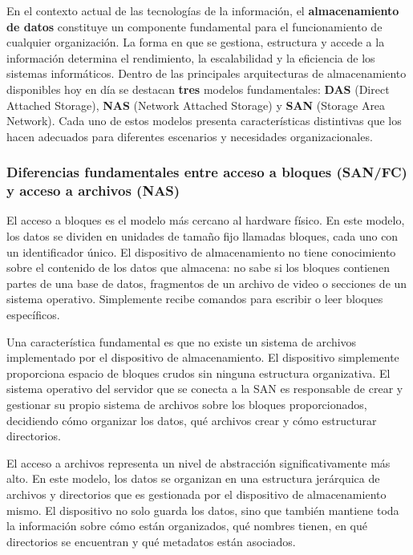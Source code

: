 En el contexto actual de las tecnologías de la información, el \textbf{almacenamiento de datos} constituye un componente fundamental para el funcionamiento de cualquier organización. La forma en que se gestiona, estructura y accede a la información determina el rendimiento, la escalabilidad y la eficiencia de los sistemas informáticos. Dentro de las principales arquitecturas de almacenamiento disponibles hoy en día se destacan \textbf{tres} modelos fundamentales: \textbf{DAS} (Direct Attached Storage), \textbf{NAS} (Network Attached Storage) y \textbf{SAN} (Storage Area Network). Cada uno de estos modelos presenta características distintivas que los hacen adecuados para diferentes escenarios y necesidades organizacionales.

\subsubsection{Diferencias fundamentales entre acceso a bloques (SAN/FC) y acceso a archivos (NAS)}

El acceso a bloques es el modelo más cercano al hardware físico. En este modelo, los datos se dividen en unidades de tamaño fijo llamadas bloques, cada uno con un identificador único. El dispositivo de almacenamiento no tiene conocimiento sobre el contenido de los datos que almacena: no sabe si los bloques contienen partes de una base de datos, fragmentos de un archivo de video o secciones de un sistema operativo. Simplemente recibe comandos para escribir o leer bloques específicos.

Una característica fundamental es que no existe un sistema de archivos implementado por el dispositivo de almacenamiento. El dispositivo simplemente proporciona espacio de bloques crudos sin ninguna estructura organizativa. El sistema operativo del servidor que se conecta a la SAN es responsable de crear y gestionar su propio sistema de archivos sobre los bloques proporcionados, decidiendo cómo organizar los datos, qué archivos crear y cómo estructurar directorios.

El acceso a archivos representa un nivel de abstracción significativamente más alto. En este modelo, los datos se organizan en una estructura jerárquica de archivos y directorios que es gestionada por el dispositivo de almacenamiento mismo. El dispositivo no solo guarda los datos, sino que también mantiene toda la información sobre cómo están organizados, qué nombres tienen, en qué directorios se encuentran y qué metadatos están asociados.

